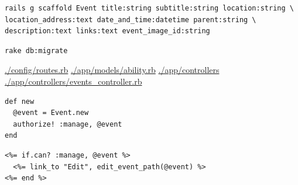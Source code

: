 \documentclass[11pt]{article}
\begin{document}
\begin{verbatim}
rails g scaffold Event title:string subtitle:string location:string \ 
location_address:text date_and_time:datetime parent:string \
description:text links:text event_image_id:string
\end{verbatim}

\begin{verbatim}
rake db:migrate
\end{verbatim}

\url{./config/routes.rb}
\url{./app/models/ability.rb}
\url{./app/controllers}
\url{./app/controllers/events_controller.rb}

\begin{verbatim}
def new
  @event = Event.new
  authorize! :manage, @event
end
\end{verbatim}

\begin{verbatim}
<%= if.can? :manage, @event %>
  <%= link_to "Edit", edit_event_path(@event) %>
<%= end %>
\end{verbatim}
\end{document}
